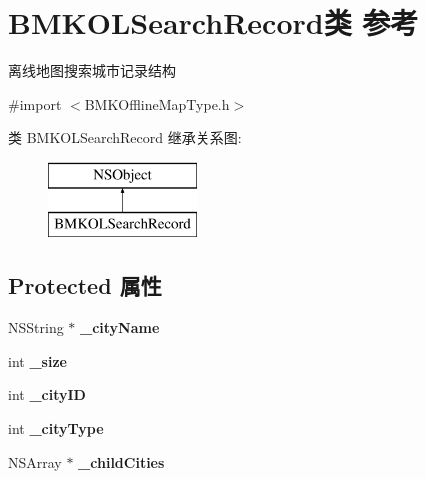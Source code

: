\hypertarget{interface_b_m_k_o_l_search_record}{\section{B\+M\+K\+O\+L\+Search\+Record类 参考}
\label{interface_b_m_k_o_l_search_record}
}


离线地图搜索城市记录结构  




{\ttfamily \#import $<$B\+M\+K\+Offline\+Map\+Type.\+h$>$}

类 B\+M\+K\+O\+L\+Search\+Record 继承关系图\+:\begin{figure}[H]
\begin{center}
\leavevmode
\includegraphics[height=2.000000cm]{interface_b_m_k_o_l_search_record}
\end{center}
\end{figure}
\subsection*{Protected 属性}
\begin{DoxyCompactItemize}
\item 
\hypertarget{interface_b_m_k_o_l_search_record_abb283493e35764e63a41766d40f9f016}{N\+S\+String $\ast$ {\bfseries \+\_\+city\+Name}}\label{interface_b_m_k_o_l_search_record_abb283493e35764e63a41766d40f9f016}

\item 
\hypertarget{interface_b_m_k_o_l_search_record_a16e88995e8c282f3aa7a1dc72cdc9580}{int {\bfseries \+\_\+size}}\label{interface_b_m_k_o_l_search_record_a16e88995e8c282f3aa7a1dc72cdc9580}

\item 
\hypertarget{interface_b_m_k_o_l_search_record_a9ed9011244b41c5360e7d9bd010d7e53}{int {\bfseries \+\_\+city\+I\+D}}\label{interface_b_m_k_o_l_search_record_a9ed9011244b41c5360e7d9bd010d7e53}

\item 
\hypertarget{interface_b_m_k_o_l_search_record_abda23ccbf5aa6fe33911d76a268f013d}{int {\bfseries \+\_\+city\+Type}}\label{interface_b_m_k_o_l_search_record_abda23ccbf5aa6fe33911d76a268f013d}

\item 
\hypertarget{interface_b_m_k_o_l_search_record_a0e6d2797e93de33955702cf362f6ab08}{N\+S\+Array $\ast$ {\bfseries \+\_\+child\+Cities}}\label{interface_b_m_k_o_l_search_record_a0e6d2797e93de33955702cf362f6ab08}

\end{DoxyCompactItemize}
